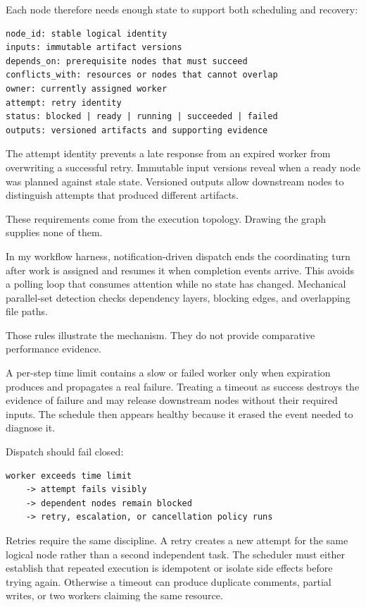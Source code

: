 Each node therefore needs enough state to support both scheduling and recovery:

\begin{verbatim}
node_id: stable logical identity
inputs: immutable artifact versions
depends_on: prerequisite nodes that must succeed
conflicts_with: resources or nodes that cannot overlap
owner: currently assigned worker
attempt: retry identity
status: blocked | ready | running | succeeded | failed
outputs: versioned artifacts and supporting evidence
\end{verbatim}

The attempt identity prevents a late response from an expired worker from overwriting a successful retry. Immutable input versions reveal when a ready node was planned against stale state. Versioned outputs allow downstream nodes to distinguish attempts that produced different artifacts.

These requirements come from the execution topology. Drawing the graph supplies none of them.

In my workflow harness, notification-driven dispatch ends the coordinating turn after work is assigned and resumes it when completion events arrive. This avoids a polling loop that consumes attention while no state has changed. Mechanical parallel-set detection checks dependency layers, blocking edges, and overlapping file paths.

Those rules illustrate the mechanism. They do not provide comparative performance evidence.

A per-step time limit contains a slow or failed worker only when expiration produces and propagates a real failure. Treating a timeout as success destroys the evidence of failure and may release downstream nodes without their required inputs. The schedule then appears healthy because it erased the event needed to diagnose it.

Dispatch should fail closed:

\begin{verbatim}
worker exceeds time limit
    -> attempt fails visibly
    -> dependent nodes remain blocked
    -> retry, escalation, or cancellation policy runs
\end{verbatim}

Retries require the same discipline. A retry creates a new attempt for the same logical node rather than a second independent task. The scheduler must either establish that repeated execution is idempotent or isolate side effects before trying again. Otherwise a timeout can produce duplicate comments, partial writes, or two workers claiming the same resource.

